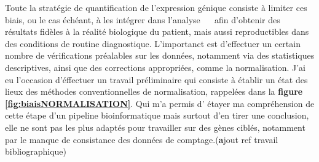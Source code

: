 Toute la stratégie de quantification de l’expression génique consiste à limiter ces biais, ou le cas échéant, à les intégrer dans l’analyse~ \textemdash~ afin d’obtenir des résultats fidèles à la réalité biologique du patient, 
mais aussi reproductibles dans des conditions de routine diagnostique.
L’importanct est d’effectuer un certain nombre de vérifications préalables sur les données, notamment via des statistiques descriptives, ainsi que des corrections appropriées, comme la normalisation. 
J'ai eu l'occasion d'éffectuer un  travail préliminaire qui consiste à établir un état des lieux des méthodes conventionnelles de normalisation,
rappelées dans la \textbf{figure \ref{fig:biaisNORMALISATION}}. Qui m'a permis d' étayer ma compréhension de cette étape d'un pipeline bioinformatique mais surtout d'en tirer une conclusion,
 elle ne sont pas les plus adaptés pour travailler sur des gènes ciblés, notamment par le manque de consistance des données de comptage.(\textbf ajout ref travail bibliographique)
 
